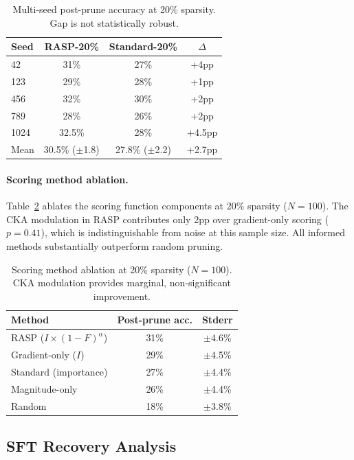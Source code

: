 \documentclass[11pt,a4paper]{article}
\begin{document}
\begin{table}[t]
\centering
\small
\caption{Multi-seed post-prune accuracy at 20\% sparsity. Gap is not statistically robust.}
\label{tab:multiseed}
\begin{tabular}{lccc}
\toprule
\textbf{Seed} & \textbf{RASP-20\%} & \textbf{Standard-20\%} & $\Delta$ \\
\midrule
42 & 31\% & 27\% & +4pp \\
123 & 29\% & 28\% & +1pp \\
456 & 32\% & 30\% & +2pp \\
789 & 28\% & 26\% & +2pp \\
1024 & 32.5\% & 28\% & +4.5pp \\
\midrule
Mean & 30.5\% ($\pm$1.8) & 27.8\% ($\pm$2.2) & +2.7pp \\
\bottomrule
\end{tabular}
\end{table}

\paragraph{Scoring method ablation.} Table~\ref{tab:ablation} ablates the scoring function components at 20\% sparsity ($N=100$). The CKA modulation in RASP contributes only 2pp over gradient-only scoring ($p=0.41$), which is indistinguishable from noise at this sample size. All informed methods substantially outperform random pruning.

\begin{table}[t]
\centering
\small
\caption{Scoring method ablation at 20\% sparsity ($N=100$). CKA modulation provides marginal, non-significant improvement.}
\label{tab:ablation}
\begin{tabular}{lcc}
\toprule
\textbf{Method} & \textbf{Post-prune acc.} & \textbf{Stderr} \\
\midrule
RASP ($I \times (1{-}F)^\alpha$) & 31\% & $\pm$4.6\% \\
Gradient-only ($I$) & 29\% & $\pm$4.5\% \\
Standard (importance) & 27\% & $\pm$4.4\% \\
Magnitude-only & 26\% & $\pm$4.4\% \\
Random & 18\% & $\pm$3.8\% \\
\bottomrule
\end{tabular}
\end{table}

\subsection{SFT Recovery Analysis}
\label{sec:sft}
\end{document}
